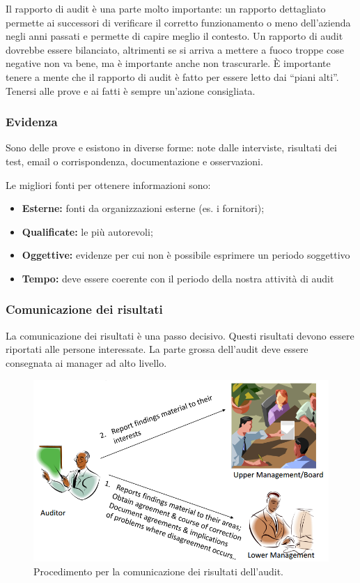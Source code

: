 Il rapporto di audit è una parte molto importante: un rapporto dettagliato
permette ai successori di verificare il corretto funzionamento o meno
dell'azienda negli anni passati e permette di capire meglio il contesto. Un
rapporto di audit dovrebbe essere bilanciato, altrimenti se si arriva a mettere
a fuoco troppe cose negative non va bene, ma è importante anche non trascurarle.
È importante tenere a mente che il rapporto di audit è fatto per essere letto
dai ``piani alti''. Tenersi alle prove e ai fatti è sempre un'azione
consigliata.

\subsubsection{Evidenza}

Sono delle prove e esistono in diverse forme: note dalle interviste, risultati
dei test, email o corrispondenza, documentazione e osservazioni.

Le migliori fonti per ottenere informazioni sono:
\begin{itemize}
\item \textbf{Esterne:} fonti da organizzazioni esterne (es. i fornitori);
\item \textbf{Qualificate:} le più autorevoli;
\item \textbf{Oggettive:} evidenze per cui non è possibile esprimere un periodo
soggettivo
\item \textbf{Tempo:} deve essere coerente con il periodo della nostra attività
di audit
\end{itemize}

\subsubsection{Comunicazione dei risultati}

La comunicazione dei risultati è una passo decisivo. Questi risultati devono
essere riportati alle persone interessate.
La parte grossa dell'audit deve essere consegnata ai manager ad alto
livello.

\begin{figure}[h!]
        \begin{center}
                \includegraphics[scale=0.4]{res/img/communication_audit.png}
        \end{center}
        \caption{Procedimento per la comunicazione dei risultati dell'audit.}
\end{figure}

